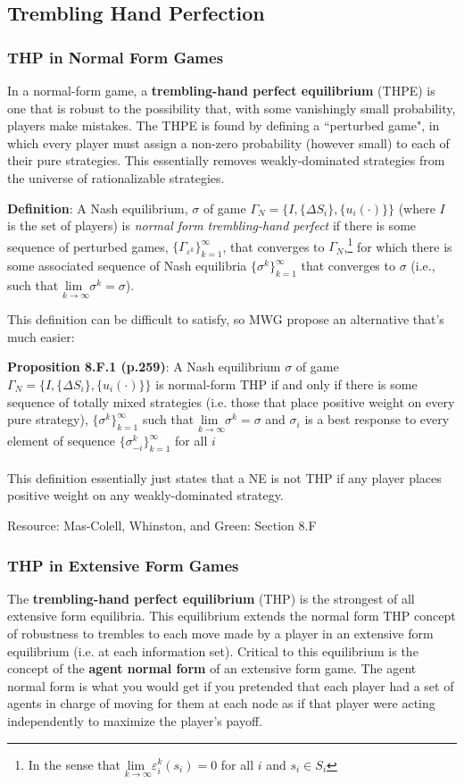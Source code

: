 \documentclass{article}
\newcommand{\red}[1]{{\color{red}#1}}
\begin{document}
\subsection{Trembling Hand Perfection}
\subsubsection{THP in Normal Form Games}
In a normal-form game, a \textbf{trembling-hand perfect equilibrium} (THPE) is one that is robust to the possibility that, with some vanishingly small probability, players make mistakes. The THPE is found by defining a ``perturbed game", in which every player must assign a non-zero probability (however small) to each of their pure strategies. This essentially removes weakly-dominated strategies from the universe of rationalizable strategies. 


\textbf{Definition}: A Nash equilibrium, $\sigma$ of game ${\Gamma_N=\{I,\{\Delta S_i\},\{u_i(\cdot)\}\}}$ (where $I$ is the set of players) is \textit{normal form trembling-hand perfect} if there is some sequence of perturbed games, $\{\Gamma_{\varepsilon^k}\}_{k=1}^\infty$, that converges to $\Gamma_N$,\footnote{In the sense that ${\underset{k\rightarrow\infty}{\text{lim }}\varepsilon_i^k(s_i)=0}$ for all $i$ and ${s_i\in S_i}$} for which there is some associated sequence of Nash equilibria ${\{\sigma^k\}_{k=1}^\infty}$ that converges to $\sigma$ (i.e., such that ${\underset{k\rightarrow\infty}{\text{lim }}\sigma^k=\sigma}$).

This definition can be difficult to satisfy, so MWG propose an alternative that's much easier:


\textbf{Proposition 8.F.1 (p.259)}: A Nash equilibrium $\sigma$ of game ${\Gamma_N=\{I,\{\Delta S_i\},\{u_i(\cdot)\}\}}$ is normal-form THP if and only if there is some sequence of totally mixed strategies (i.e. those that place positive weight on every pure strategy), $\{\sigma^k\}_{k=1}^\infty$ such that ${\underset{k\rightarrow\infty}{\text{lim }}\sigma^k=\sigma}$ and $\sigma_i$ is a best response to every element of sequence $\{\sigma^k_{-i}\}_{k=1}^\infty$ for all $i$ \\
\\
This definition essentially just states that a NE is not THP if any player places positive weight on any weakly-dominated strategy.

\red{Resource: Mas-Colell, Whinston, and Green: Section 8.F}

\subsubsection{THP in Extensive Form Games}
The \textbf{trembling-hand perfect equilibrium} (THP) is the strongest of all extensive form equilibria. This equilibrium extends the normal form THP concept of robustness to trembles to each move made by a player in an extensive form equilibrium (i.e. at each information set). Critical to this equilibrium is the concept of the \textbf{agent normal form} of an extensive form game. The agent normal form is what you would get if you pretended that each player had a set of agents in charge of moving for them at each node as if that player were acting independently to maximize the player's payoff.
\end{document}
